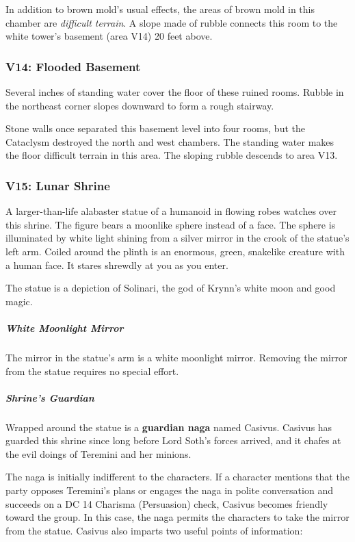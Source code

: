 \documentclass[10pt,a4paper,twoside,bg=print,twocolumn,openany,nodeprecatedcode]{dndbook}
\begin{document}
In addition to brown mold's usual effects, the areas of brown mold in this chamber are \textit{difficult terrain}. A slope made of rubble connects this room to the white tower's basement (area V14) 20 feet above.

\subsubsection{V14: Flooded Basement}
\begin{DndReadAloud}{}
Several inches of standing water cover the floor of these ruined rooms. Rubble in the northeast corner slopes downward to form a rough stairway.

\end{DndReadAloud}

Stone walls once separated this basement level into four rooms, but the Cataclysm destroyed the north and west chambers. The standing water makes the floor difficult terrain in this area. The sloping rubble descends to area V13.

\subsubsection{V15: Lunar Shrine}
\begin{DndReadAloud}{}
A larger-than-life alabaster statue of a humanoid in flowing robes watches over this shrine. The figure bears a moonlike sphere instead of a face. The sphere is illuminated by white light shining from a silver mirror in the crook of the statue's left arm. Coiled around the plinth is an enormous, green, snakelike creature with a human face. It stares shrewdly at you as you enter.

\end{DndReadAloud}

The statue is a depiction of Solinari, the god of Krynn's white moon and good magic.

\subparagraph{White Moonlight Mirror}
The mirror in the statue's arm is a white moonlight mirror. Removing the mirror from the statue requires no special effort.

\subparagraph{Shrine's Guardian}
Wrapped around the statue is a \textbf{guardian naga} named Casivus. Casivus has guarded this shrine since long before Lord Soth's forces arrived, and it chafes at the evil doings of Teremini and her minions.

The naga is initially indifferent to the characters. If a character mentions that the party opposes Teremini's plans or engages the naga in polite conversation and succeeds on a DC 14 Charisma (Persuasion) check, Casivus becomes friendly toward the group. In this case, the naga permits the characters to take the mirror from the statue. Casivus also imparts two useful points of information:
\end{document}

